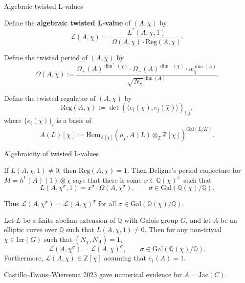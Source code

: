 \documentclass[10pt]{beamer}
\begin{document}
\begin{frame}[t]{Algebraic twisted L-values}

Define the \textbf{algebraic twisted L-value} of $ (A, \chi) $ by
$$ \mathcal{L}(A, \chi) := \dfrac{L^*(A, \chi, 1)}{\Omega(A, \chi) \cdot \mathrm{Reg}(A, \chi)}. $$

\pause

Define the twisted period of $ (A, \chi) $ by
$$ \Omega(A, \chi) := \dfrac{\Omega_+(A)^{\dim^+(\chi)} \cdot \Omega_-(A)^{\dim^-(\chi)} \cdot w_\chi^{\dim(A)}}{\sqrt{N_\chi}^{\dim(A)}}. $$

\pause

Define the twisted regulator of $ (A, \chi) $ by
$$ \mathrm{Reg}(A, \chi) := \det(\langle e_i(\chi), e_j(\widehat{\chi}) \rangle)_{i, j}, $$
where $ \{e_i(\chi)\}_i $ is a basis of
$$ A(L)[\chi] := \mathrm{Hom}_{\mathbb{Z}[\chi]}(\rho_\chi, A(L) \otimes_\mathbb{Z} \mathbb{Z}[\chi])^{\mathrm{Gal}(L / K)}. $$

\end{frame}

\begin{frame}[t]{Algebraicity of twisted L-values}

If $ L(A, \chi, 1) \ne 0 $, then $ \mathrm{Reg}(A, \chi) = 1 $. Then Deligne's period conjecture for $ M = h^1(A)(1) \otimes \chi $ says that there is some $ x \in \mathbb{Q}(\chi)^\times $ such that
$$ L(A, \chi^\sigma, 1) = x^\sigma \cdot \Omega(A, \chi^\sigma), \qquad \sigma \in \mathrm{Gal}(\mathbb{Q}(\chi) / \mathbb{Q}). $$

\pause

Thus $ \mathcal{L}(A, \chi^\sigma) = \mathcal{L}(A, \chi)^\sigma $ for all $ \sigma \in \mathrm{Gal}(\mathbb{Q}(\chi) / \mathbb{Q}) $.

\pause

\begin{theorem}
Let $ L $ be a finite abelian extension of $ \mathbb{Q} $ with Galois group $ G $, and let $ A $ be an elliptic curve over $ \mathbb{Q} $ such that $ L(A, \chi, 1) \ne 0 $. Then for any non-trivial $ \chi \in \mathrm{Irr}(G) $ such that $ (N_\chi, N_A) = 1 $,
$$ \mathcal{L}(A, \chi^\sigma) = \mathcal{L}(A, \chi)^\sigma, \qquad \sigma \in \mathrm{Gal}(\mathbb{Q}(\chi) / \mathbb{Q}). $$
Furthermore, $ \mathcal{L}(A, \chi) \in \mathbb{Z}[\chi] $ assuming that $ c_1(A) = 1 $.
\end{theorem}

\pause

Castillo--Evans--Wiersema 2023 gave numerical evidence for $ A = \mathrm{Jac}(C) $.

\end{frame}
\end{document}
